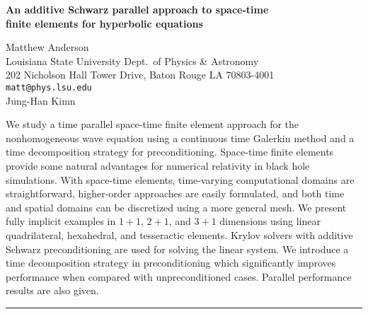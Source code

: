 \documentclass[twosided]{report}
\begin{document}
\begin{center}
{\large			%
{\bf An additive Schwarz parallel approach to space-time \\
finite elements for hyperbolic equations}}

	Matthew Anderson \\
	Louisiana State University Dept.~of Physics \& Astronomy \\
	202 Nicholson Hall Tower Drive,  Baton Rouge LA 70803-4001 \\
	{\tt matt@phys.lsu.edu} \\
	Jung-Han Kimn
\end{center}
We study a time parallel space-time finite element approach
for the nonhomogeneous wave equation using a continuous time
Galerkin method and a time decomposition strategy for
preconditioning. Space-time finite elements provide some
natural advantages for numerical relativity in black hole
simulations. With space-time elements, time-varying
computational domains are straightforward, higher-order
approaches are easily formulated, and both time and spatial
domains can be discretized using a more general mesh. We
present fully implicit examples in $1+1$, $2+1$, and $3+1$
dimensions using linear quadrilateral, hexahedral, and
tesseractic elements. Krylov solvers with additive Schwarz
preconditioning are used for solving the linear system. We
introduce a time decomposition strategy in preconditioning
which significantly improves performance when compared with
unpreconditioned cases. Parallel performance results are
also given.




	\begin{center} \rule{6in}{1pt} \end{center}
\end{document}
